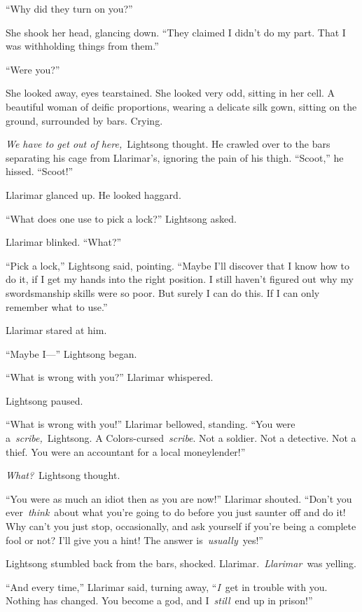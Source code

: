 “Why did they turn on you?”

She shook her head, glancing down. “They claimed I didn’t do my part. That I was withholding things from them.”

“Were you?”

She looked away, eyes tearstained. She looked very odd, sitting in her cell. A beautiful woman of deific proportions, wearing a delicate silk gown, sitting on the ground, surrounded by bars. Crying.

\textit{We have to get out of here,}~Lightsong thought. He crawled over to the bars separating his cage from Llarimar’s, ignoring the pain of his thigh. “Scoot,” he hissed. “Scoot!”

Llarimar glanced up. He looked haggard.

“What does one use to pick a lock?” Lightsong asked.

Llarimar blinked. “What?”

“Pick a lock,” Lightsong said, pointing. “Maybe I’ll discover that I know how to do it, if I get my hands into the right position. I still haven’t figured out why my swordsmanship skills were so poor. But surely I can do this. If I can only remember what to use.”

Llarimar stared at him.

“Maybe I—” Lightsong began.

“What is wrong with you?” Llarimar whispered.

Lightsong paused.

“What is wrong with you!” Llarimar bellowed, standing. “You were a~\textit{scribe,}~Lightsong. A Colors-cursed~\textit{scribe}. Not a soldier. Not a detective. Not a thief. You were an accountant for a local moneylender!”

\textit{What?}~Lightsong thought.

“You were as much an idiot then as you are now!” Llarimar shouted. “Don’t you ever~\textit{think}~about what you’re going to do before you just saunter off and do it! Why can’t you just stop, occasionally, and ask yourself if you’re being a complete fool or not? I’ll give you a hint! The answer is~\textit{usually}~yes!”

Lightsong stumbled back from the bars, shocked. Llarimar.~\textit{Llarimar}~was yelling.

“And every time,” Llarimar said, turning away, “\textit{I}~get in trouble with you. Nothing has changed. You become a god, and I~\textit{still}~end up in prison!”

